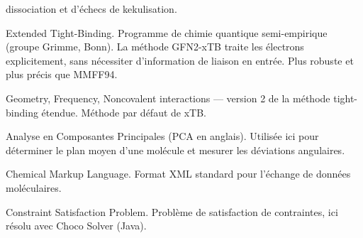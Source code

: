 \documentclass[a4paper,12pt]{article}
\begin{document}
\begin{description}
    dissociation et d'échecs de kekulisation.
  \item[xTB] Extended Tight-Binding. Programme de chimie quantique semi-empirique (groupe
    Grimme, Bonn). La méthode GFN2-xTB traite les électrons explicitement, sans nécessiter
    d'information de liaison en entrée. Plus robuste et plus précis que MMFF94.
  \item[GFN2-xTB] Geometry, Frequency, Noncovalent interactions — version 2 de la méthode
    tight-binding étendue. Méthode par défaut de xTB.
  \item[ACP] Analyse en Composantes Principales (PCA en anglais). Utilisée ici pour
    déterminer le plan moyen d'une molécule et mesurer les déviations angulaires.
  \item[CML] Chemical Markup Language. Format XML standard pour l'échange de données
    moléculaires.
  \item[CSP] Constraint Satisfaction Problem. Problème de satisfaction de contraintes, ici
    résolu avec Choco Solver (Java).
\end{description}
\end{document}
